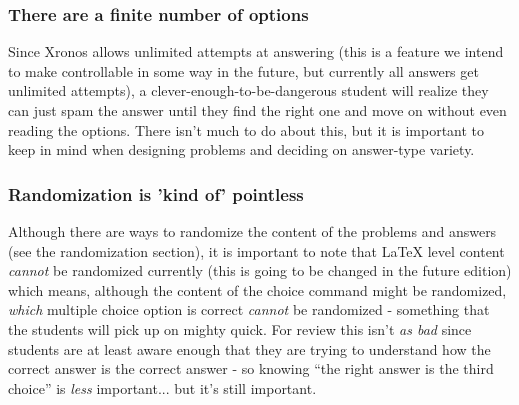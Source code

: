 \documentclass{ximera}
\begin{document}
    \subsubsection*{There are a finite number of options}
        Since Xronos allows unlimited attempts at answering (this is a feature we intend to make controllable in some way in the future, but currently all answers get unlimited attempts), a clever-enough-to-be-dangerous student will realize they can just spam the answer until they find the right one and move on without even reading the options. There isn't much to do about this, but it is important to keep in mind when designing problems and deciding on answer-type variety.
        
    \subsubsection*{Randomization is 'kind of' pointless}
        Although there are ways to randomize the content of the problems and answers (see the randomization section), it is important to note that LaTeX level content \textit{cannot} be randomized currently (this is going to be changed in the future edition) which means, although the content of the choice command might be randomized, \textit{which} multiple choice option is correct \textit{cannot} be randomized - something that the students will pick up on mighty quick. For review this isn't \textit{as bad} since students are at least aware enough that they are trying to understand how the correct answer is the correct answer - so knowing ``the right answer is the third choice'' is \textit{less} important... but it's still important.
        
        
\end{document}
